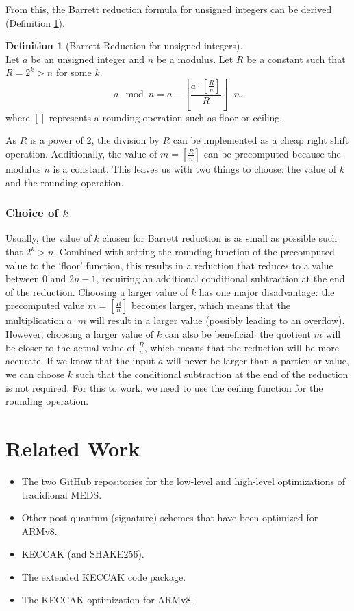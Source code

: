 \documentclass[11pt,a4paper]{report}
\theoremstyle{definition}
\newtheorem{definition}{Definition}[section]
\begin{document}
From this, the Barrett reduction formula for unsigned integers can be derived (Definition \ref{def:barrettreduction}).

\begin{definition}[Barrett Reduction for unsigned integers]~\\
  \label{def:barrettreduction}
  Let $a$ be an unsigned integer and $n$ be a modulus.
  Let $R$ be a constant such that $R = 2^k > n$ for some $k$.
  \[
    a \mod n = a - \left\lfloor \frac{a \cdot \left[\frac{R}{n}\right]}{R} \right\rfloor \cdot n.
  \]
  where $\left[\right]$ represents a rounding operation such as floor or ceiling.
\end{definition}

As $R$ is a power of 2, the division by $R$ can be implemented as a cheap right shift operation. Additionally, the value of $m = \left[\frac{R}{n}\right]$ can be precomputed because the modulus $n$ is a constant. This leaves us with two things to choose: the value of $k$ and the rounding operation.

\subsubsection{Choice of $k$}
\label{sec:choiceofk}
Usually, the value of $k$ chosen for Barrett reduction is as small as possible such that $2^k > n$. Combined with setting the rounding function of the precomputed value to the `floor' function, this results in a reduction that reduces to a value between $0$ and $2n-1$, requiring an additional conditional subtraction at the end of the reduction. Choosing a larger value of $k$ has one major disadvantage: the precomputed value $m = \left[\frac{R}{n}\right]$ becomes larger, which means that the multiplication $a \cdot m$ will result in a larger value (possibly leading to an overflow). However, choosing a larger value of $k$ can also be beneficial: the quotient $m$ will be closer to the actual value of $\frac{R}{n}$, which means that the reduction will be more accurate. If we know that the input $a$ will never be larger than a particular value, we can choose $k$ such that the conditional subtraction at the end of the reduction is not required. For this to work, we need to use the ceiling function for the rounding operation.

\section{Related Work}
\begin{itemize}
  \item The two GitHub repositories for the low-level and high-level optimizations of tradidional MEDS.
  \item Other post-quantum (signature) schemes that have been optimized for ARMv8.
  \item KECCAK (and SHAKE256).
  \item The extended KECCAK code package.
  \item The KECCAK optimization for ARMv8.
\end{itemize}
\end{document}
